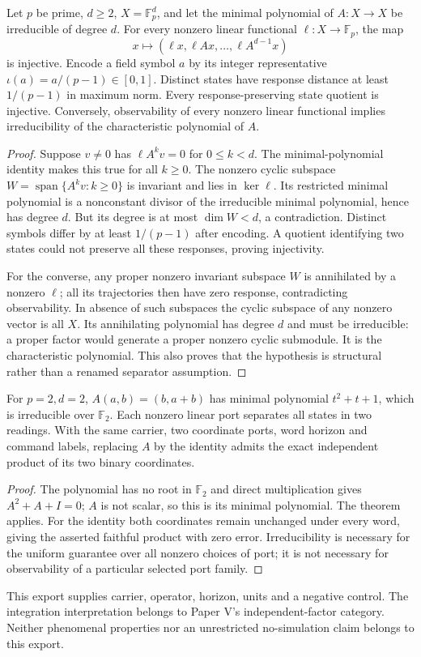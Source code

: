\begin{theorem}
\label{thm:basecore-irreducible-observation}
Let $p$ be prime, $d\ge2$, $X=\mathbb F_p^d$, and let the minimal polynomial
of $A:X\to X$ be irreducible of degree $d$. For every nonzero linear
functional $\ell:X\to\mathbb F_p$, the map
\[
 x\longmapsto(\ell x,\ell Ax,\ldots,\ell A^{d-1}x)
\]
is injective. Encode a field symbol $a$ by its integer representative
$\iota(a)=a/(p-1)\in[0,1]$. Distinct states have response distance at least
$1/(p-1)$ in maximum norm. Every response-preserving state quotient is
injective. Conversely, observability of every nonzero linear functional
implies irreducibility of the characteristic polynomial of $A$.
\end{theorem}
\begin{proof}
Suppose $v\ne0$ has $\ell A^kv=0$ for $0\le k<d$. The minimal-polynomial
identity makes this true for all $k\ge0$. The nonzero cyclic subspace
$W=\operatorname{span}\{A^kv:k\ge0\}$ is invariant and lies in $\ker\ell$.
Its restricted minimal polynomial is a nonconstant divisor of the irreducible
minimal polynomial, hence has degree $d$. But its degree is at most
$\dim W<d$, a contradiction. Distinct symbols differ by at least $1/(p-1)$
after encoding. A quotient identifying two states could not preserve all
these responses, proving injectivity.

For the converse, any proper nonzero invariant subspace $W$ is annihilated
by a nonzero $\ell$; all its trajectories then have zero response, contradicting
observability. In absence of such subspaces the cyclic subspace of any
nonzero vector is all $X$. Its annihilating polynomial has degree $d$ and
must be irreducible: a proper factor would generate a proper nonzero cyclic
submodule. It is the characteristic polynomial. This also proves that the
hypothesis is structural rather than a renamed separator assumption.
\end{proof}

\begin{proposition}
\label{prop:basecore-irreducible-control}
For $p=2,d=2$, $A(a,b)=(b,a+b)$ has minimal polynomial $t^2+t+1$,
which is irreducible over $\mathbb F_2$. Each nonzero linear port separates
all states in two readings. With the same carrier, two coordinate ports,
word horizon and command labels, replacing $A$ by the identity admits the
exact independent product of its two binary coordinates.
\end{proposition}
\begin{proof}
The polynomial has no root in $\mathbb F_2$ and direct multiplication gives
$A^2+A+I=0$; $A$ is not scalar, so this is its minimal polynomial. The theorem
applies. For the identity both coordinates remain unchanged under every
word, giving the asserted faithful product with zero error. Irreducibility
is necessary for the uniform guarantee over all nonzero choices of port;
it is not necessary for observability of a particular selected port family.
\end{proof}

This export supplies carrier, operator, horizon, units and a negative control.
The integration interpretation belongs to Paper V's independent-factor
category. Neither phenomenal properties nor an unrestricted no-simulation
claim belongs to this export.
